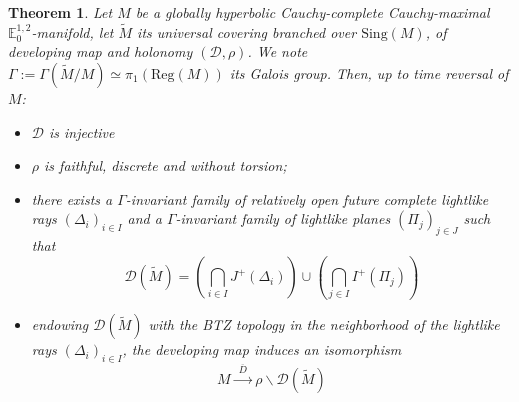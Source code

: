 \documentclass[a4paper,12pt]{article}
\newtheorem{thm}{Theorem}    %
\def\D{\mathcal{D}}
\def\D{\mathcal{D}}
\def\sing{\mathrm{Sing}}
\newcommand{\mass}[1]{{\mathbb E}^{1,2}_{#1}}
\def\Reg{\mathrm{Reg}}
\def\reg{\Reg}
\def\sing{\mathrm{Sing}}
\def\reg{\mathrm{Reg}}
\def\D{\mathcal{D}}
\def\Reg{\mathrm{Reg}}
\def\sing{\mathrm{Sing}}
\begin{document}
\begin{thm}\label{theo:globally_hyperbolic_cauchy_complete_cauchy_maximal} Let $M$ be a globally hyperbolic Cauchy-complete Cauchy-maximal $\mass{0}$-manifold, let $\widetilde M$ its universal covering branched over $\sing(M)$, of  developing map and holonomy  $(\D,\rho)$. We note $\Gamma:=\Gamma(\widetilde M/M)\simeq\pi_1(\reg(M))$ its Galois group.  Then, up to time reversal of $M$:
\begin{itemize}
 \item $\D$ is injective
 \item $\rho$ is faithful, discrete and without torsion; 
 \item there exists a $\Gamma$-invariant family of relatively open future complete lightlike  rays $(\Delta_i)_{i\in I}$ and a $\Gamma$-invariant family of lightlike planes $(\Pi_j)_{j\in J}$ such that 
 $$\D(\widetilde M) = \left(\bigcap_{i\in I} J^+(\Delta_i) \right) \cup \left(\bigcap_{j\in I} I^+(\Pi_j) \right)$$
 
 \item endowing $\D(\widetilde M)$ with the BTZ topology in the neighborhood of the lightlike rays $(\Delta_i)_{i\in I}$, the developing map induces an isomorphism
 $$ M\xrightarrow{~~\overline D~~} \rho\backslash\D(\widetilde M
 ) $$
\end{itemize}


\end{thm}
\end{document}
